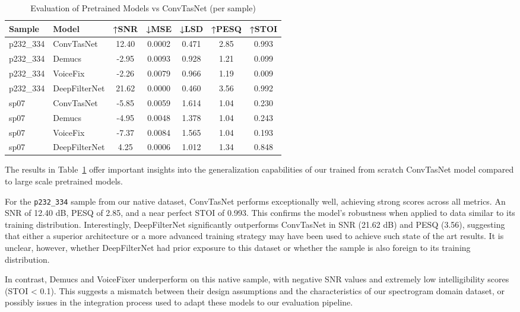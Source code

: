 \vspace{1em}
\begin{table}[H]
\centering
\caption{Evaluation of Pretrained Models vs ConvTasNet (per sample)}
\label{tab:pretrained_eval}
\begin{tabular}{|l|l|c|c|c|c|c|}
\hline
\textbf{Sample} & \textbf{Model} & \textbf{↑SNR} & \textbf{↓MSE} & \textbf{↓LSD} & \textbf{↑PESQ} & \textbf{↑STOI} \\
\hline
p232\_334 & ConvTasNet      & 12.40 & 0.0002 & 0.471 & 2.85 & 0.993 \\
p232\_334 & Demucs          & -2.95 & 0.0093 & 0.928 & 1.21 & 0.099 \\
p232\_334 & VoiceFix        & -2.26 & 0.0079 & 0.966 & 1.19 & 0.009 \\
p232\_334 & DeepFilterNet   & 21.62 & 0.0000 & 0.460 & 3.56 & 0.992 \\
\hline
sp07      & ConvTasNet      & -5.85 & 0.0059 & 1.614 & 1.04 & 0.230 \\
sp07      & Demucs          & -4.95 & 0.0048 & 1.378 & 1.04 & 0.243 \\
sp07      & VoiceFix        & -7.37 & 0.0084 & 1.565 & 1.04 & 0.193 \\
sp07      & DeepFilterNet   & 4.25  & 0.0006 & 1.012 & 1.34 & 0.848 \\
\hline
\end{tabular}
\end{table}


The results in Table~\ref{tab:pretrained_eval} offer important insights into the generalization capabilities of our trained from scratch ConvTasNet model compared to large scale pretrained models.

For the \texttt{p232\_334} sample from our native dataset, ConvTasNet performs exceptionally well, achieving strong scores across all metrics. An SNR of 12.40 dB, PESQ of 2.85, and a near perfect STOI of 0.993. This confirms the model’s robustness when applied to data similar to its training distribution. Interestingly, DeepFilterNet significantly outperforms ConvTasNet in SNR (21.62 dB) and PESQ (3.56), suggesting that either a superior architecture or a more advanced training strategy may have been used to achieve such state of the art results. It is unclear, however, whether DeepFilterNet had prior exposure to this dataset or whether the sample is also foreign to its training distribution.

In contrast, Demucs and VoiceFixer underperform on this native sample, with negative SNR values and extremely low intelligibility scores (STOI < 0.1). This suggests a mismatch between their design assumptions and the characteristics of our spectrogram domain dataset, or possibly issues in the integration process used to adapt these models to our evaluation pipeline.

